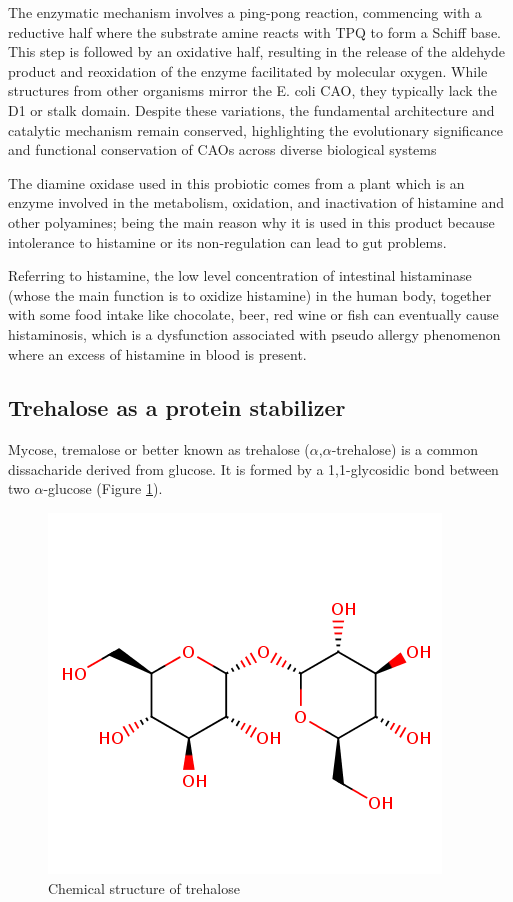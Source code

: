 \documentclass[a4paper]{article}
\begin{document}
The enzymatic mechanism involves a ping-pong reaction, commencing with a reductive half where the substrate amine reacts with TPQ to form a Schiff base. This step is followed by an oxidative half, resulting in the release of the aldehyde product and reoxidation of the enzyme facilitated by molecular oxygen. While structures from other organisms mirror the E. coli CAO, they typically lack the D1 or stalk domain. Despite these variations, the fundamental architecture and catalytic mechanism remain conserved, highlighting the evolutionary significance and functional conservation of CAOs across diverse biological systems

The diamine oxidase used in this probiotic comes from a plant which is an enzyme involved in the metabolism, oxidation, and inactivation of histamine and other polyamines; being the main reason why it is used in this product because intolerance to histamine or its non-regulation can lead to gut problems.

Referring to histamine, the low level concentration of intestinal histaminase (whose the main function is to oxidize histamine) in the human body, together with some food intake like chocolate, beer, red wine or fish can eventually cause histaminosis, which is a dysfunction associated with pseudo allergy phenomenon\cite{Jumarie2017} where an excess of histamine in blood is present. 
	


\subsection{Trehalose as a protein stabilizer}

Mycose, tremalose or better known as trehalose ($\alpha$,$\alpha$-trehalose) is a common dissacharide derived from glucose. It is formed by a 1,1-glycosidic bond between two $\alpha$-glucose (Figure \ref{fig:tre2D}).

\begin{figure}[h]
    \centering
    \includegraphics[trim= 10 60 10 90,clip,width = 0.4\hsize]{./figures/trehalosa}
    \caption{Chemical structure of trehalose}
    \label{fig:tre2D}
\end{figure}
\end{document}
